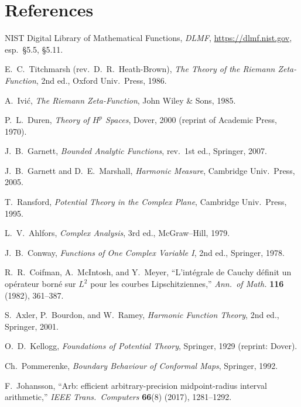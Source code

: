 \documentclass[11pt]{article}
\numberwithin{equation}{section}
\theoremstyle{remark}
\begin{document}
\section*{References}
\begin{thebibliography}{99}

NIST Digital Library of Mathematical Functions, \emph{DLMF}, \url{https://dlmf.nist.gov}, esp.\ §5.5, §5.11.

E.\ C.\ Titchmarsh (rev.\ D.\ R.\ Heath-Brown),
\emph{The Theory of the Riemann Zeta-Function}, 2nd ed., Oxford Univ.\ Press, 1986.

A.\ Ivi\'c, \emph{The Riemann Zeta-Function}, John Wiley \& Sons, 1985.

P.\ L.\ Duren, \emph{Theory of $H^p$ Spaces}, Dover, 2000 (reprint of Academic Press, 1970).

J.\ B.\ Garnett, \emph{Bounded Analytic Functions}, rev.\ 1st ed., Springer, 2007.

J.\ B.\ Garnett and D.\ E.\ Marshall, \emph{Harmonic Measure}, Cambridge Univ.\ Press, 2005.

T.\ Ransford, \emph{Potential Theory in the Complex Plane}, Cambridge Univ.\ Press, 1995.

L.\ V.\ Ahlfors, \emph{Complex Analysis}, 3rd ed., McGraw--Hill, 1979.

J.\ B.\ Conway, \emph{Functions of One Complex Variable I}, 2nd ed., Springer, 1978.

R.\ R.\ Coifman, A.\ McIntosh, and Y.\ Meyer,
``L’int\'egrale de Cauchy d\'efinit un op\'erateur born\'e sur $L^2$ pour les courbes Lipschitziennes,''
\emph{Ann.\ of Math.} \textbf{116} (1982), 361--387.

S.\ Axler, P.\ Bourdon, and W.\ Ramey, \emph{Harmonic Function Theory}, 2nd ed., Springer, 2001.

O.\ D.\ Kellogg, \emph{Foundations of Potential Theory}, Springer, 1929 (reprint: Dover).

Ch.\ Pommerenke, \emph{Boundary Behaviour of Conformal Maps}, Springer, 1992.

F.\ Johansson, ``Arb: efficient arbitrary-precision midpoint-radius interval arithmetic,'' \emph{IEEE Trans.\ Computers} \textbf{66}(8) (2017), 1281--1292.

\end{thebibliography}
\end{document}
